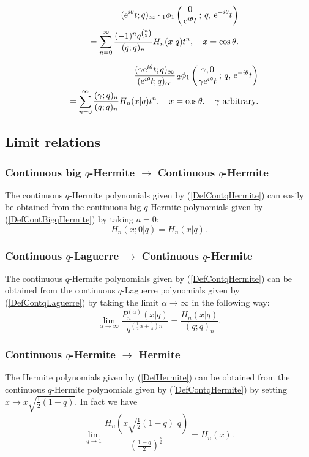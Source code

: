\documentclass[envcountchap,graybox]{svmono}
\newcounter{rom}
\newcommand{\qhyp}[5]{\mbox{}_{#1}{\phi}_{#2}
\left(\genfrac{}{}{0pt}{}{#3}{#4}\,;\,q,\,#5\right)}
\newcommand{\e}{\textrm{e}}
\newcommand{\qhyp}[5]{\,\mbox{}_{#1}\phi_{#2}\!\left(
  \genfrac{}{}{0pt}{}{#3}{#4};#5\right)}
\begin{document}
{{\begin{eqnarray}
\label{GenContqHermite2}
& &(\e^{i\theta}t;q)_{\infty}\cdot\qhyp{1}{1}{0}{\e^{i\theta}t}{\e^{-i\theta}t}\nonumber\\
& &{}=\sum_{n=0}^{\infty}\frac{(-1)^nq^{\binom{n}{2}}}{(q;q)_n}H_n(x|q)t^n,
\quad x=\cos\theta.
\end{eqnarray}

\begin{eqnarray}
\label{GenContqHermite3}
& &\frac{(\gamma\e^{i\theta}t;q)_{\infty}}{(\e^{i\theta}t;q)_{\infty}}\,
\qhyp{2}{1}{\gamma,0}{\gamma\e^{i\theta}t}{\e^{-i\theta}t}\nonumber\\
& &{}=\sum_{n=0}^{\infty}\frac{(\gamma;q)_n}{(q;q)_n}H_n(x|q)t^n,
\quad x=\cos\theta,\quad\textrm{$\gamma$ arbitrary}.
\end{eqnarray}

\subsection*{Limit relations}

\subsubsection*{Continuous big $q$-Hermite $\rightarrow$ Continuous $q$-Hermite}
The continuous $q$-Hermite polynomials given by (\ref{DefContqHermite})
can easily be obtained from the continuous big $q$-Hermite polynomials given by
(\ref{DefContBigqHermite}) by taking $a=0$:
$$H_n(x;0|q)=H_n(x|q).$$

\subsubsection*{Continuous $q$-Laguerre $\rightarrow$ Continuous $q$-Hermite}
The continuous $q$-Hermite polynomials given by (\ref{DefContqHermite}) can
be obtained from the continuous $q$-Laguerre polynomials given by
(\ref{DefContqLaguerre}) by taking the limit $\alpha\rightarrow\infty$ in the
following way:
$$\lim_{\alpha\rightarrow\infty}
\frac{P_n^{(\alpha)}(x|q)}{q^{(\frac{1}{2}\alpha+\frac{1}{4})n}}
=\frac{H_n(x|q)}{(q;q)_n}.$$

\subsubsection*{Continuous $q$-Hermite $\rightarrow$ Hermite}
The Hermite polynomials given by (\ref{DefHermite}) can be obtained
from the continuous $q$-Hermite polynomials given by (\ref{DefContqHermite}) by
setting $x\rightarrow x\sqrt{\frac{1}{2}(1-q)}$. In fact we have
\begin{equation}
\lim_{q\rightarrow 1}
\frac{H_n(x\sqrt{\frac{1}{2}(1-q)}|q)}
{\left(\frac{1-q}{2}\right)^{\frac{n}{2}}}=H_n(x).
\end{equation}

}}
\end{document}
